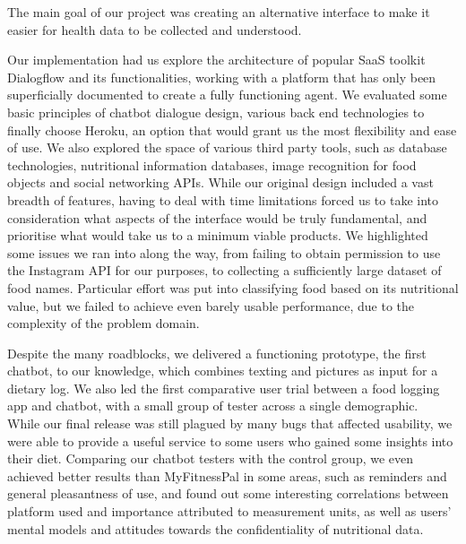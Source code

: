 The main goal of our project was creating an alternative interface to make it easier for health data to be collected and understood.

Our implementation had us explore the architecture of popular SaaS toolkit Dialogflow and its functionalities, working with a platform that has only been superficially documented to create a fully functioning agent. We evaluated some basic principles of chatbot dialogue design, various back end technologies to finally choose Heroku, an option that would grant us the most flexibility and ease of use. We also explored the space of various third party tools, such as database technologies, nutritional information databases, image recognition for food objects and social networking APIs. While our original design included a vast breadth of features, having to deal with time limitations forced us to take into consideration what aspects of the interface would be truly fundamental, and prioritise what would take us to a minimum viable products. We highlighted some issues we ran into along the way, from failing to obtain permission to use the Instagram API for our purposes, to collecting a sufficiently large dataset of food names. Particular effort was put into classifying food based on its nutritional value, but we failed to achieve even barely usable performance, due to the complexity of the problem domain.

Despite the many roadblocks, we delivered a functioning prototype, the first chatbot, to our knowledge, which combines texting and pictures as input for a dietary log. We also led the first comparative user trial between a food logging app and chatbot, with a small group of tester across a single demographic. \\
While our final release was still plagued by many bugs that affected usability, we were able to provide a useful service to some users who gained some insights into their diet. Comparing our chatbot testers with the control group, we even achieved better results than MyFitnessPal in some areas, such as reminders and general pleasantness of use, and found out some interesting correlations between platform used and importance attributed to measurement units, as well as users' mental models and attitudes towards the confidentiality of nutritional data. 

